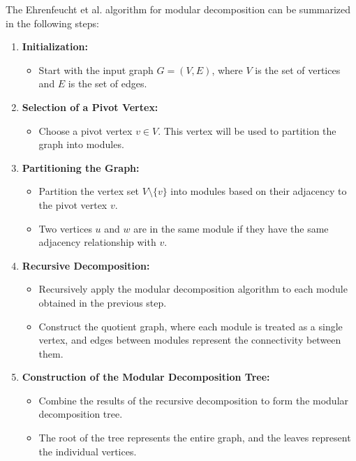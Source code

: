 The Ehrenfeucht et al. algorithm for modular decomposition can be summarized in the following steps:

\begin{enumerate}
    \item \textbf{Initialization:}
    \begin{itemize}
        \item Start with the input graph $G = (V, E)$, where $V$ is the set of vertices and $E$ is the set of edges.
    \end{itemize}
    \item \textbf{Selection of a Pivot Vertex:}
    \begin{itemize}
        \item Choose a pivot vertex $v \in V$.
        This vertex will be used to partition the graph into modules.
    \end{itemize}
    \item \textbf{Partitioning the Graph:}
    \begin{itemize}
        \item Partition the vertex set $V \setminus \{v\}$ into modules based on their adjacency to the pivot vertex $v$.
        \item Two vertices $u$ and $w$ are in the same module if they have the same adjacency relationship with $v$.
    \end{itemize}
    \item \textbf{Recursive Decomposition:}
    \begin{itemize}
        \item Recursively apply the modular decomposition algorithm to each module obtained in the previous step.
        \item Construct the quotient graph, where each module is treated as a single vertex, and edges between modules represent the connectivity between them.
    \end{itemize}
    \item \textbf{Construction of the Modular Decomposition Tree:}
    \begin{itemize}
        \item Combine the results of the recursive decomposition to form the modular decomposition tree.
        \item The root of the tree represents the entire graph, and the leaves represent the individual vertices.
    \end{itemize}
\end{enumerate}


